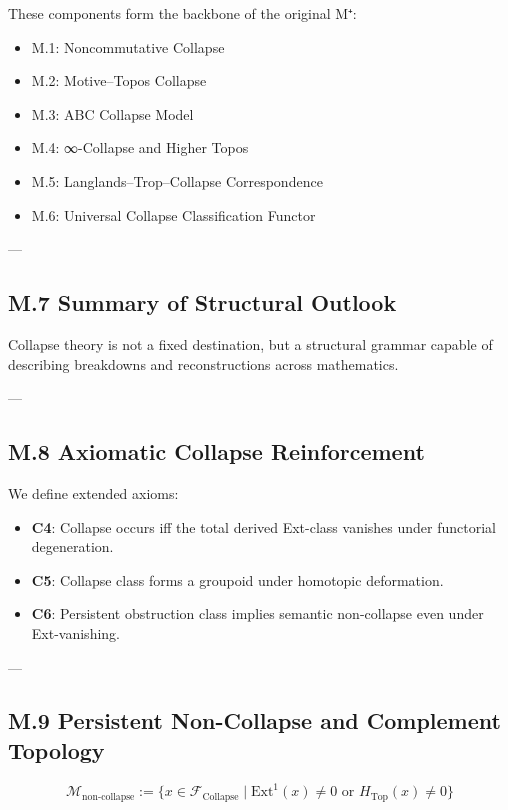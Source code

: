 \documentclass[11pt]{article}
\begin{document}
\begin{axiom}
\begin{axiom}
{{These components form the backbone of the original M⁺:

\begin{itemize}
  \item M.1: Noncommutative Collapse
  \item M.2: Motive–Topos Collapse
  \item M.3: ABC Collapse Model
  \item M.4: ∞-Collapse and Higher Topos
  \item M.5: Langlands–Trop–Collapse Correspondence
  \item M.6: Universal Collapse Classification Functor
\end{itemize}

---

\subsection*{M.7 Summary of Structural Outlook}

Collapse theory is not a fixed destination, but a structural grammar  
capable of describing breakdowns and reconstructions across mathematics.

---

\subsection*{M.8 Axiomatic Collapse Reinforcement}

We define extended axioms:

\begin{itemize}
  \item \textbf{C4}: Collapse occurs iff the total derived Ext-class vanishes under functorial degeneration.
  \item \textbf{C5}: Collapse class forms a groupoid under homotopic deformation.
  \item \textbf{C6}: Persistent obstruction class implies semantic non-collapse even under Ext-vanishing.
\end{itemize}

---

\subsection*{M.9 Persistent Non-Collapse and Complement Topology}

\[
\mathcal{M}_{\text{non-collapse}} := \{ x \in \mathcal{F}_{\text{Collapse}} \mid \mathrm{Ext}^1(x) \neq 0 \text{ or } H_{\text{Top}}(x) \neq 0 \}
\]

}}
\end{axiom}
\end{axiom}
\end{document}
